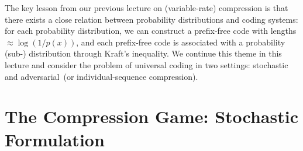 \documentclass[12pt]{article}
\begin{document}
	\MakeScribeTop
The key lesson from our previous lecture on (variable-rate) compression is that there exists a close relation between probability distributions and coding systems: for each probability distribution, we can construct a prefix-free code with lengths $\approx \log(1/p(x))$, and each prefix-free code is associated with a probability (sub-) distribution through Kraft's inequality. We continue this theme in this lecture and consider the problem of universal coding in two settings: stochastic and adversarial~(or individual-sequence compression).  

\section{The Compression Game: Stochastic Formulation}
\end{document}
